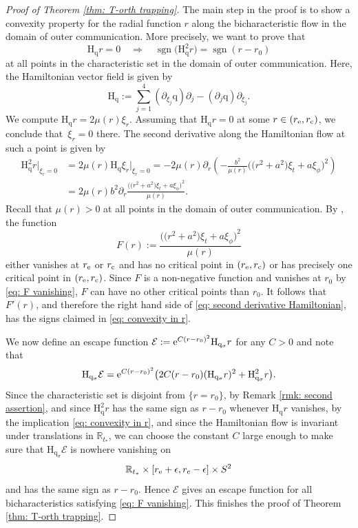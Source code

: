 \documentclass[10pt,a4paper]{amsart}
\newcommand{\e}{\epsilon}
\newcommand{\E}{\mathcal E}
\renewcommand{\d}{\partial}
\renewcommand{\H}{\mathrm H}
\renewcommand{\E}{\mathcal E}
\newcommand{\q}{\mathrm q}
\newcommand{\s}{\sigma}
\newcommand{\sgn}{\operatorname{sgn}}
\newcommand{\R}[0]{\mathbb{R}}
\numberwithin{equation}{section}
\begin{document}
\begin{proof}[Proof of Theorem \ref{thm: T-orth trapping}]
The main step in the proof is to show a convexity property for the radial function $r$ along the bicharacteristic flow in the domain of outer communication.
More precisely, we want to prove that
\begin{equation}\label{eq: convexity in r}
	\H_\q r
		= 0 \quad \Rightarrow \quad \sgn\big( \H_\q^2 r \big) = \sgn(r - r_0)
\end{equation}
at all points in the characteristic set in the domain of outer communication.
Here, the Hamiltonian vector field is given by
\[
	\H_{\q}
		:= \sum_{j = 1}^4 (\d_{\xi_j}\q)\d_j - (\d_j \q)\d_{\xi_j}.
\]
We compute $\H_{\q} r
		= 2 \mu(r) \xi_r$.
Assuming that $\H_{\q} r = 0$ at some $r \in (r_{\rm e}, r_{\rm c})$, we conclude that~${\xi_r = 0}$ there.
The second derivative along the Hamiltonian flow at such a point is given by
\begin{align}
	\H_{\q}^2 r|_{\xi_r = 0}
		&= 2 \mu(r) \H_{\q} \xi_r|_{\xi_r = 0} = - 2 \mu(r) \d_r \left( - \frac{b^2}{\mu(r)} \big( \big(r^2 + a^2\big) \xi_t + a \xi_\phi \big)^2 \right) \nonumber\\
		&= 2 \mu(r) b^2 \d_r \frac{\big( \big(r^2 + a^2\big) \xi_t + a \xi_\phi \big)^2}{\mu(r)}.\label{eq: second derivative Hamiltonian}
\end{align}
Recall that $\mu(r) > 0$ at all points in the domain of outer communication.
By \cite[Theorem~3.2\,(a)]{PV2023}, the function
\[
	F(r)
		:= \frac{\big( \big(r^2 + a^2\big) \xi_t + a \xi_\phi \big)^2}{\mu(r)}
\]
either vanishes at $r_{\rm e}$ or $r_{\rm c}$ and has no critical point in $(r_{\rm e}, r_{\rm c})$ or has precisely one critical point in $(r_{\rm e}, r_{\rm c})$.
Since $F$ is a non-negative function and vanishes at $r_0$ by \eqref{eq: F vanishing}, $F$ can have no other critical points than $r_0$.
It follows that $F'(r)$, and therefore the right hand side of \eqref{eq: second derivative Hamiltonian}, has the signs claimed in \eqref{eq: convexity in r}.

We now define an escape function $\E := {\rm e}^{C(r - r_0)^2}\H_{\q_\s} r$
for any $C > 0$ and note that
\[
	\H_{\q_\s} \E
		= {\rm e}^{C(r - r_0)^2} \big( 2 C(r - r_0) (\H_{\q_{\s}}r)^2 + \H_{\q_\s}^2 r \big).
\]
Since the characteristic set is disjoint from $\{r = r_0\}$, by Remark \ref{rmk: second assertion}, and since $\H_\q^2 r$ has the same sign as $r - r_0$ whenever $\H_\q r$ vanishes, by the implication \eqref{eq: convexity in r}, and since the Hamiltonian flow is invariant under translations in $\R_{t_*}$, we can choose the constant $C$ large enough to make sure that $\H_{\q_\s} \E$ is nowhere vanishing on
\[
	\R_{t_*} \times [r_{\rm e} + \e, r_{\rm c} - \e] \times S^2
\]
and has the same sign as $r - r_0$.
Hence $\E$ gives an escape function for all bicharacteristics satisfying \eqref{eq: F vanishing}.
This finishes the proof of Theorem \ref{thm: T-orth trapping}.
\end{proof}
\end{document}
